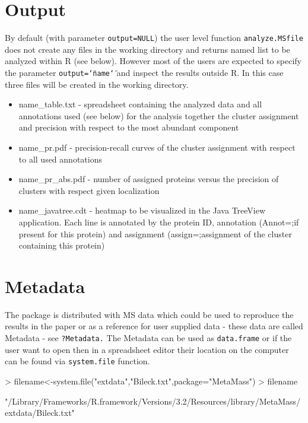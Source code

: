 \documentclass[a4paper]{article}
\numberwithin{equation}{subsection}
\begin{document}
\section{Output}
By default (with parameter \texttt{output=NULL}) the user level function
\texttt{analyze.MSfile} does not create any files in the working
directory and returns named list to be analyzed within R (see
below). However most of the users are expected to specify the
parameter \texttt{output=\char`\"name\char`\"} and inspect the results outside
R. In this case three files will be created in the working directory.
\begin{itemize}
  \item name\_table.txt - spreadsheet containing the analyzed data and
    all annotations used (see below) for the analysis together the
    cluster assignment and precision with respect to the most abundant component
    \item name\_pr.pdf - precision-recall curves of the
      cluster assignment with respect to all used annotations
       \item name\_pr\_abs.pdf - number of assigned proteins versus the
         precision of clusters with respect given localization
      \item name\_javatree.cdt - heatmap to be visualized in the Java
        TreeView application. Each line is annotated by the protein
        ID, annotation (Annot=;if present for this protein) and
        assignment (assign=;assignment of the cluster containing
        this protein)
  \end{itemize}
\section{Metadata}
The package is distributed with MS data which could be used to
reproduce the results in the paper or as a reference for user supplied
data - these data are called Metadata - see \texttt{?Metadata.}
The Metadata can be used as \texttt{data.frame} or if the user want to
open then in a spreadsheet editor their location on the computer can
be found via \texttt{system.file} function.
\scriptsize
\begin{Schunk}
\begin{Sinput}
> filename<-system.file("extdata","Bileck.txt",package="MetaMass")
> filename
\end{Sinput}
\begin{Soutput}
[1] "/Library/Frameworks/R.framework/Versions/3.2/Resources/library/MetaMass/extdata/Bileck.txt"
\end{Soutput}
\end{Schunk}
\normalsize
\end{document}
